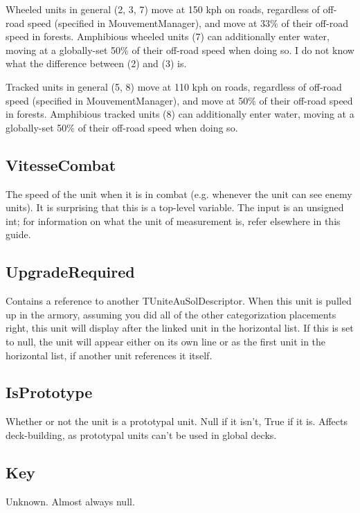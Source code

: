 \documentclass{article}
\begin{document}
Wheeled units in general (2, 3, 7) move at 150 kph on roads, regardless of off-road speed (specified in MouvementManager), and move at 33\% of their off-road speed in forests. Amphibious wheeled units (7) can additionally enter water, moving at a globally-set 50\% of their off-road speed when doing so. I do not know what the difference between (2) and (3) is.

Tracked units in general (5, 8) move at 110 kph on roads, regardless of off-road speed (specified in MouvementManager), and move at 50\% of their off-road speed in forests. Amphibious tracked units (8) can additionally enter water, moving at a globally-set 50\% of their off-road speed when doing so.

\subsection{VitesseCombat}

The speed of the unit when it is in combat (e.g. whenever the unit can see enemy units). It is surprising that this is a top-level variable. The input is an unsigned int; for information on what the unit of measurement is, refer elsewhere in this guide.

\subsection{UpgradeRequired}

Contains a reference to another TUniteAuSolDescriptor. When this unit is pulled up in the armory, assuming you did all of the other categorization placements right, this unit will display after the linked unit in the horizontal list. If this is set to null, the unit will appear either on its own line or as the first unit in the horizontal list, if another unit references it itself.

\subsection{IsPrototype}

Whether or not the unit is a prototypal unit. Null if it isn't, True if it is. Affects deck-building, as prototypal units can't be used in global decks.

\subsection{Key}

Unknown. Almost always null.
\end{document}

